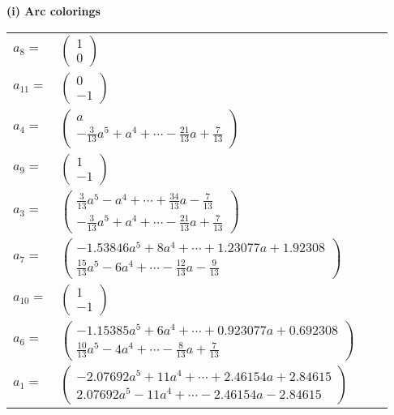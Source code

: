 \documentclass[1p]{elsarticle_modified}
\theoremstyle{definition}
\begin{document}
\flushleft \textbf{(i) Arc colorings}\\
\begin{tabular}{m{7pt} m{180pt} m{7pt} m{180pt} }
\flushright $a_{8}=$&$\begin{pmatrix}1\\0\end{pmatrix}$ \\
\flushright $a_{11}=$&$\begin{pmatrix}0\\-1\end{pmatrix}$ \\
\flushright $a_{4}=$&$\begin{pmatrix}a\\-\frac{3}{13} a^5+a^4+\cdots-\frac{21}{13} a+\frac{7}{13}\end{pmatrix}$ \\
\flushright $a_{9}=$&$\begin{pmatrix}1\\-1\end{pmatrix}$ \\
\flushright $a_{3}=$&$\begin{pmatrix}\frac{3}{13} a^5- a^4+\cdots+\frac{34}{13} a-\frac{7}{13}\\-\frac{3}{13} a^5+a^4+\cdots-\frac{21}{13} a+\frac{7}{13}\end{pmatrix}$ \\
\flushright $a_{7}=$&$\begin{pmatrix}-1.53846 a^{5}+8 a^{4}+\cdots+1.23077 a+1.92308\\\frac{15}{13} a^5-6 a^4+\cdots-\frac{12}{13} a-\frac{9}{13}\end{pmatrix}$ \\
\flushright $a_{10}=$&$\begin{pmatrix}1\\-1\end{pmatrix}$ \\
\flushright $a_{6}=$&$\begin{pmatrix}-1.15385 a^{5}+6 a^{4}+\cdots+0.923077 a+0.692308\\\frac{10}{13} a^5-4 a^4+\cdots-\frac{8}{13} a+\frac{7}{13}\end{pmatrix}$ \\
\flushright $a_{1}=$&$\begin{pmatrix}-2.07692 a^{5}+11 a^{4}+\cdots+2.46154 a+2.84615\\2.07692 a^{5}-11 a^{4}+\cdots-2.46154 a-2.84615\end{pmatrix}$ \\

\end{tabular}
\end{document}
